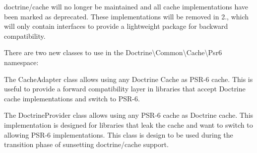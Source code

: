 doctrine/cache will no longer be maintained and all cache implementations have been marked as deprecated. These implementations will be removed in 2., which will only contain interfaces to provide a lightweight package for backward compatibility.

There are two new classes to use in the {\ttfamily Doctrine\textbackslash{}Common\textbackslash{}Cache\textbackslash{}Psr6} namespace\+:
\begin{DoxyItemize}
\item The {\ttfamily Cache\+Adapter} class allows using any Doctrine Cache as PSR-\/6 cache. This is useful to provide a forward compatibility layer in libraries that accept Doctrine cache implementations and switch to PSR-\/6.
\item The {\ttfamily Doctrine\+Provider} class allows using any PSR-\/6 cache as Doctrine cache. This implementation is designed for libraries that leak the cache and want to switch to allowing PSR-\/6 implementations. This class is design to be used during the transition phase of sunsetting doctrine/cache support. 
\end{DoxyItemize}